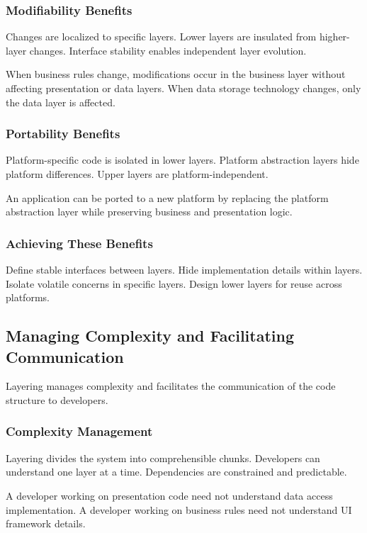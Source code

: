 \documentclass[11pt]{article}
\begin{document}
\subsubsection{Modifiability Benefits}

Changes are localized to specific layers. Lower layers are insulated from higher-layer changes. Interface stability enables independent layer evolution.

When business rules change, modifications occur in the business layer without affecting presentation or data layers. When data storage technology changes, only the data layer is affected.

\subsubsection{Portability Benefits}

Platform-specific code is isolated in lower layers. Platform abstraction layers hide platform differences. Upper layers are platform-independent.

An application can be ported to a new platform by replacing the platform abstraction layer while preserving business and presentation logic.

\subsubsection{Achieving These Benefits}

Define stable interfaces between layers. Hide implementation details within layers. Isolate volatile concerns in specific layers. Design lower layers for reuse across platforms.

\subsection{Managing Complexity and Facilitating Communication}

Layering manages complexity and facilitates the communication of the code structure to developers.

\subsubsection{Complexity Management}

Layering divides the system into comprehensible chunks. Developers can understand one layer at a time. Dependencies are constrained and predictable.

A developer working on presentation code need not understand data access implementation. A developer working on business rules need not understand UI framework details.
\end{document}
